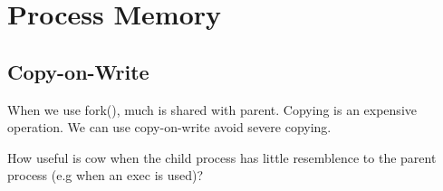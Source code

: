 
\chapter{Process Memory}





\section{Copy-on-Write}

When we use fork(), much is shared with parent. 
Copying is an expensive operation. 
We can use copy-on-write avoid severe copying.

\begin{example}
How useful is cow when the child process has little resemblence 
to the parent process (e.g when an exec is used)?
\end{example}